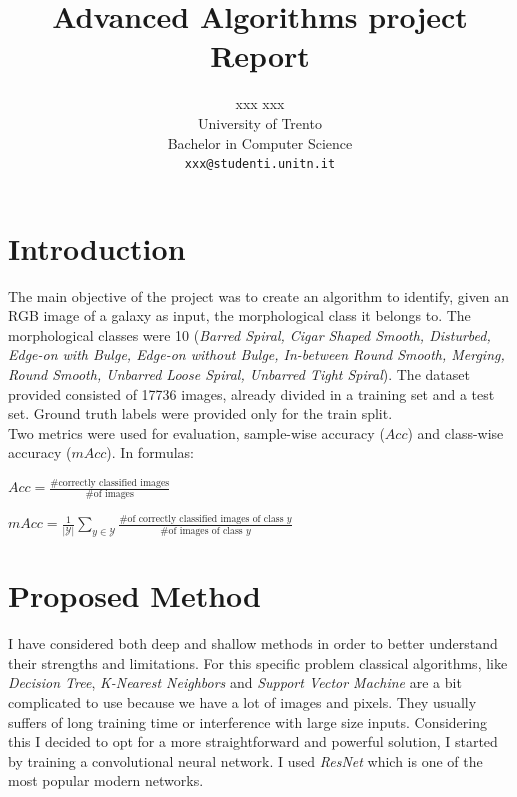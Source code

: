 \documentclass[10pt,twocolumn,letterpaper]{article}
\begin{document}
\title{\textsf{Advanced Algorithms project Report}}

\author{xxx xxx\\
University of Trento\\
Bachelor in Computer Science\\
{\tt\small xxx@studenti.unitn.it}
}

\maketitle

\section{Introduction}

The main objective of the project was to create an algorithm to identify, given an RGB image of a galaxy as input, the morphological class it belongs to. The morphological classes were 10 (\textit{Barred Spiral, Cigar Shaped Smooth, Disturbed, Edge-on with Bulge, Edge-on without Bulge, In-between Round Smooth, Merging, Round Smooth, Unbarred Loose Spiral, Unbarred Tight Spiral}). The dataset provided consisted of 17736 images, already divided in a training set and a test set. Ground truth labels were provided only for the train split. \\
Two metrics were used for evaluation, sample-wise accuracy ($Acc$) and class-wise accuracy ($mAcc$). In formulas:
\begin{center} 
$Acc =\frac{\text{\# correctly classified images}}{\text{\# of images}}$ 
\end{center}
\begin{center} 
$mAcc = \frac{1}{|\mathcal Y|}\sum_{y\in\mathcal Y} \frac{\text{\# of correctly classified images of class $y$}}{\text{\# of images of class $y$}}$
\end{center}

\section{Proposed Method}

I have considered both deep and shallow methods in order to better understand their strengths and limitations. For this specific problem classical algorithms, like \textit{Decision Tree}, \textit{K-Nearest Neighbors} and \textit{Support Vector Machine} are a bit complicated to use because we have a lot of images and pixels. 
They usually suffers of long training time or interference with large size inputs. Considering this I decided to opt for a more straightforward and powerful solution, I started by training a convolutional neural network. I used \textit{ResNet} which is one of the most popular modern networks. 
\end{document}
